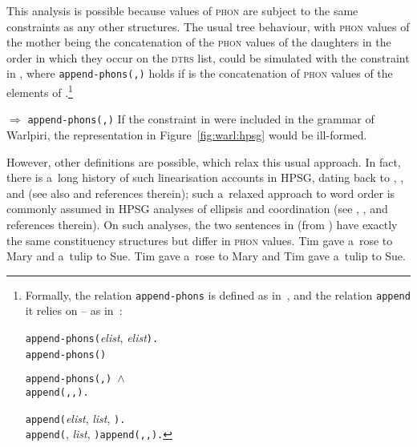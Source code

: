 \documentclass[output=paper,hidelinks]{langscibook}
\begin{document}
This analysis is possible because values of \textsc{phon} are subject to the same constraints as any other structures.  The usual tree behaviour, with \textsc{phon} values of the mother being the concatenation of the \textsc{phon} values of the daughters in the order in which they occur on the \textsc{dtrs} list, could be simulated with the constraint in , where \texttt{append-phons(\avm{\2},\avm{\1})} holds if \avm{\1} is the concatenation of \textsc{phon} values of the elements of \avm{\2}.\footnote{Formally, the relation \texttt{append-phons} is defined as in~, and the relation \texttt{append} it relies on -- as in~:

\ea\label{apph}
  \texttt{append-phons(}\textit{elist}, \textit{elist}\texttt{).} \\
  \texttt{append-phons(}\texttt{)}\,\HPSGsfl \parbox[c]{5cm}{\texttt{append-phons(\avm{\2},\avm{\4}) $\land$\\\hspace*{1em}append(\avm{\1},\avm{\4},\avm{\3}).}}
\ex\label{appp}
  \texttt{append(}\textit{elist}, \avm{\1}\textit{list}, \avm{\1}\texttt{).} \\
  \texttt{append(}, \avm{\3}\textit{list}, \texttt{)}\HPSGsfl \texttt{append(\avm{\2},\avm{\3},\avm{\4}).}
\z}

\ea\label{phon}
 \ensuremath{\Rightarrow} \texttt{append-phons(\avm{\2},\avm{\1})}
\z
If the constraint in  were included in the grammar of Warlpiri, the representation in Figure~\ref{fig:warl:hpsg} would be ill-formed.

However, other definitions are possible, which relax this usual approach.  In fact, there is a~long history of such linearisation accounts in HPSG, dating back to \citet{reap:92,reap:96}, \citet{kat:pol:95}, and \citet{kath:95b,kath:99} (see also \citealt{mull:20} and references therein); such a~relaxed approach to word order is commonly assumed in HPSG analyses of ellipsis and coordination (see \citealt{nyk:kim:20}, \citealt{abe:cha:20}, and references therein).  On such analyses, the two sentences in  (from \citealt[286]{chav:08}) have exactly the same constituency structures but differ in \textsc{phon} values.
\ea\label{ex:coord} 
\ea Tim gave a~rose to Mary and a~tulip to Sue.
\ex Tim gave a~rose to Mary and Tim gave a~tulip to Sue.
\z\z
\end{document}

